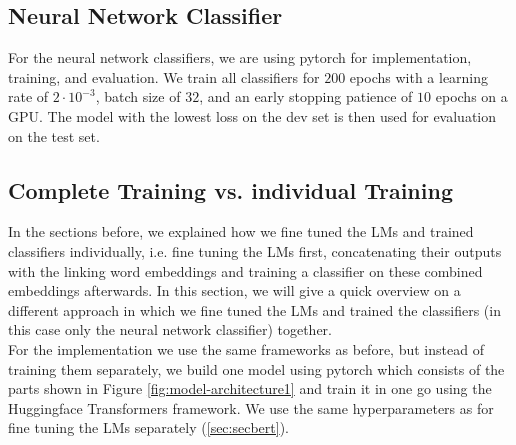 \subsection{Neural Network Classifier}
For the neural network classifiers, we are using pytorch \cite{pytorch} for implementation, training, and evaluation. We train all classifiers for $200$ epochs with a learning rate of $2 \cdot 10^{-3}$, batch size of $32$, and an early stopping patience of $10$ epochs on a GPU. The model with the lowest loss on the dev set is then used for evaluation on the test set.

\subsection{Complete Training vs. individual Training}
In the sections before, we explained how we fine tuned the LMs and trained classifiers individually, i.e. fine tuning the LMs first, concatenating their outputs with the linking word embeddings and training a classifier on these combined embeddings afterwards. In this section, we will give a quick overview on a different approach in which we fine tuned the LMs and trained the classifiers (in this case only the neural network classifier) together. \\
For the implementation we use the same frameworks as before, but instead of training them separately, we build one model using pytorch which consists of the parts shown in Figure \ref{fig:model-architecture1} and train it in one go using the Huggingface Transformers framework. We use the same hyperparameters as for fine tuning the LMs separately (\ref{sec:secbert}).